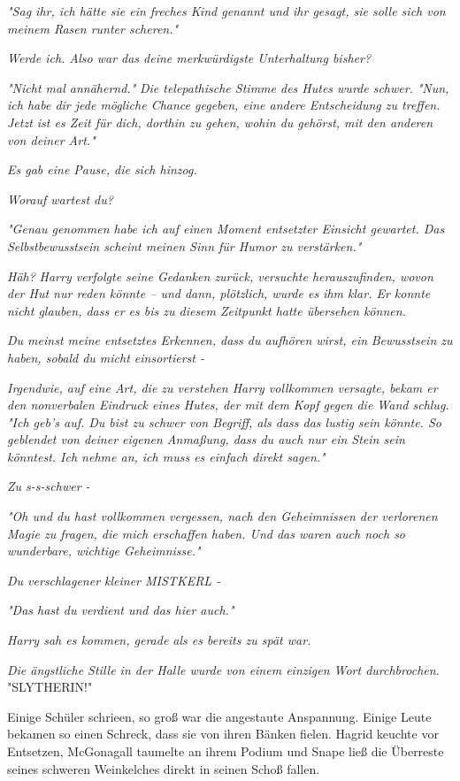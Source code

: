 {\emph{"Sag ihr, ich hätte sie ein freches Kind genannt und ihr gesagt, sie solle sich von meinem Rasen runter scheren."}

\emph{Werde ich. Also war das deine merkwürdigste Unterhaltung bisher?}

\emph{"Nicht mal annähernd."} \emph{Die telepathische Stimme des Hutes wurde schwer.} \emph{\emph{"Nun, ich habe dir jede mögliche Chance gegeben, eine andere Entscheidung zu treffen. Jetzt ist es Zeit für dich, dorthin zu gehen, wohin du gehörst, mit den anderen von deiner Art."}}

\emph{Es gab eine Pause, die sich hinzog.}

\emph{\emph{Worauf wartest du?}}

\emph{"Genau genommen habe ich auf einen Moment entsetzter Einsicht gewartet. Das Selbstbewusstsein scheint meinen Sinn für Humor zu verstärken."}

\emph{Häh?} \emph{Harry verfolgte seine Gedanken zurück, versuchte herauszufinden, wovon der Hut nur reden könnte -- und dann, plötzlich, wurde es ihm klar. Er konnte nicht glauben, dass er es bis zu diesem Zeitpunkt hatte übersehen können.}

\emph{\emph{Du meinst meine entsetztes Erkennen, dass du aufhören wirst, ein}} \emph{\emph{Bewusstsein zu haben, sobald du micht einsortierst -}}

\emph{Irgendwie, auf eine Art, die zu verstehen Harry vollkommen versagte, bekam er den nonverbalen Eindruck eines Hutes, der mit dem Kopf gegen die Wand schlug.} \emph{\emph{"Ich geb's auf. Du bist zu schwer von Begriff, als dass das lustig sein könnte. So geblendet von deiner eigenen Anmaßung, dass du auch nur ein Stein sein könntest. Ich nehme an, ich muss es einfach direkt sagen."}}

\emph{Zu s-s-schwer -}

\emph{"Oh und du hast vollkommen vergessen, nach den Geheimnissen der verlorenen Magie zu fragen, die mich erschaffen haben. Und das waren auch noch so wunderbare, wichtige Geheimnisse."}

\emph{Du verschlagener kleiner MISTKERL -}

\emph{"Das hast du verdient und das hier auch."}

\emph{Harry sah es kommen, gerade als es bereits zu spät war.}

\emph{Die ängstliche Stille in der Halle wurde von einem einzigen Wort durchbrochen.}\\ "SLYTHERIN!"

Einige Schüler schrieen, so groß war die angestaute Anspannung. Einige Leute bekamen so einen Schreck, dass sie von ihren Bänken fielen. Hagrid keuchte vor Entsetzen, McGonagall taumelte an ihrem Podium und Snape ließ die Überreste seines schweren Weinkelches direkt in seinen Schoß fallen.

}
